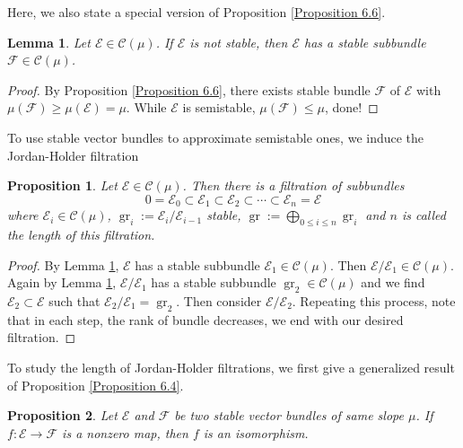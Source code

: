\documentclass{ctexart}
\newtheorem{proposition}{Proposition}[section]
\newtheorem{lemma}{Lemma}[section]
\newcommand{\grade}{\operatorname{gr}}
\begin{document}
Here, we also state a special version of Proposition \ref{Proposition 6.6}.
\begin{lemma}
    Let $\mathcal{E}\in \mathscr{C}(\mu)$.
    If $\mathcal{E}$ is not stable, then $\mathcal{E}$ has a stable subbundle $\mathcal{F}\in \mathscr{C}(\mu)$. 
    \label{Lemma 7.16}
\end{lemma}
\begin{proof}
    By Proposition \ref{Proposition 6.6}, there exists stable bundle $\mathcal{F}$ of $\mathcal{E}$ with $\mu(\mathcal{F}) \ge \mu(\mathcal{E}) = \mu$.
    While $\mathcal{E}$ is semistable, $\mu(\mathcal{F}) \le \mu$, done!
\end{proof}
To use stable vector bundles to approximate semistable ones, we induce the Jordan-Holder filtration
\begin{proposition}
    Let $\mathcal{E}\in \mathscr{C}(\mu)$.
    Then there is a filtration of subbundles
    \begin{equation}
        0 = \mathcal{E}_{0} \subset \mathcal{E}_{1} \subset \mathcal{E}_{2} \subset \cdots \subset \mathcal{E}_{n} = \mathcal{E}
    \end{equation}
    where $\mathcal{E}_{i}\in \mathscr{C}(\mu)$, $\grade_{i} := \mathcal{E}_{i}/\mathcal{E}_{i - 1}$ stable, $\grade := \bigoplus_{0 \le i \le n} \grade_{i}$ and $n$ is called the length of this filtration.
    \label{Proposition 7.7}
\end{proposition}
\begin{proof}
    By Lemma \ref{Lemma 7.16}, $\mathcal{E}$ has a stable subbundle $\mathcal{E}_{1}\in \mathscr{C}(\mu)$.
    Then $\mathcal{E}/\mathcal{E}_{1}\in \mathscr{C}(\mu)$.
    Again by Lemma \ref{Lemma 7.16}, $\mathcal{E}/\mathcal{E}_{1}$ has a stable subbundle $\grade_{2}\in \mathscr{C}(\mu)$ and we find $\mathcal{E}_{2} \subset \mathcal{E}$ such that $\mathcal{E}_{2}/\mathcal{E}_{1} = \grade_{2}$.
    Then consider $\mathcal{E}/\mathcal{E}_{2}$.
    Repeating this process, note that in each step, the rank of bundle decreases, we end with our desired filtration.
\end{proof}
To study the length of Jordan-Holder filtrations, we first give a generalized result of Proposition \ref{Proposition 6.4}.
\begin{proposition}
    Let $\mathcal{E}$ and $\mathcal{F}$ be two stable vector bundles of same slope $\mu$.
    If $f: \mathcal{E} \rightarrow \mathcal{F}$ is a nonzero map, then $f$ is an isomorphism.
    \label{Proposition 7.8}
\end{proposition}
\end{document}

